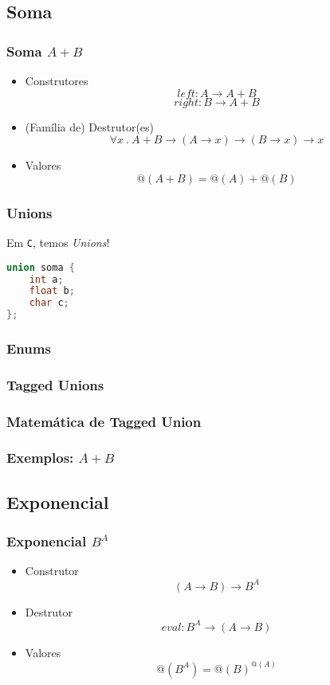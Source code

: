 \documentclass{beamer}
\makeatletter
\newcommand{\lang}[1]{\texttt{#1}}
\renewcommand{\d}{\:.\:}
\newcommand{\typetam}{@}
\makeatother
\begin{document}
\subsection{Soma}
\begin{frame}
    \frametitle{Soma \(A + B\)}
    \begin{itemize}
        \item Construtores
            \[
                left : A \to A + B
            \] \[
                right : B \to A + B
            \]
        \item (Família de) Destrutor(es)
            \[
                \forall x \d
                A + B \to (A \to x) \to (B \to x) \to x
            \]
        \item Valores
            \[
                \typetam(A + B) = \typetam(A) + \typetam(B)
            \]
    \end{itemize}
\end{frame}

\begin{frame}[fragile]
    \frametitle{Unions}
    Em \lang{C}, temos \emph{Unions}!
    \begin{lstlisting}[language=C]
union soma {
    int a;
    float b;
    char c;
};
    \end{lstlisting}
\end{frame}

\begin{frame}
    \frametitle{Enums}
\end{frame}

\begin{frame}
    \frametitle{Tagged Unions}
\end{frame}

\begin{frame}
    \frametitle{Matemática de Tagged Union}
\end{frame}

\begin{frame}
    \frametitle{Exemplos: \(A + B\)}
\end{frame}

\subsection{Exponencial}
\begin{frame}
    \frametitle{Exponencial \(B^A\)}
    \begin{itemize}
        \item Construtor
            \[
                (A \to B) \to B^A
            \]
        \item Destrutor
            \[
                eval : B^A \to (A \to B)
            \]
        \item Valores
            \[
                \typetam\left(B^A\right) = \typetam(B)^{\typetam(A)}
            \]
    \end{itemize}
\end{frame}
\end{document}

